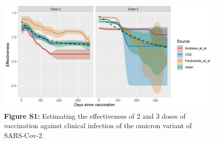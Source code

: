\documentclass[12pt]{article}
\begin{document}
\begin{figure}[h]
    \includegraphics*[width=\textwidth]{Three_paper_avg.jpg}
    \textbf{Figure S1:} Estimating the effectiveness of 2 and 3 doses of vaccination against clinical infection of the omicron variant of SARS-Cov-2.
\end{figure}

\newpage
    
\end{document}
